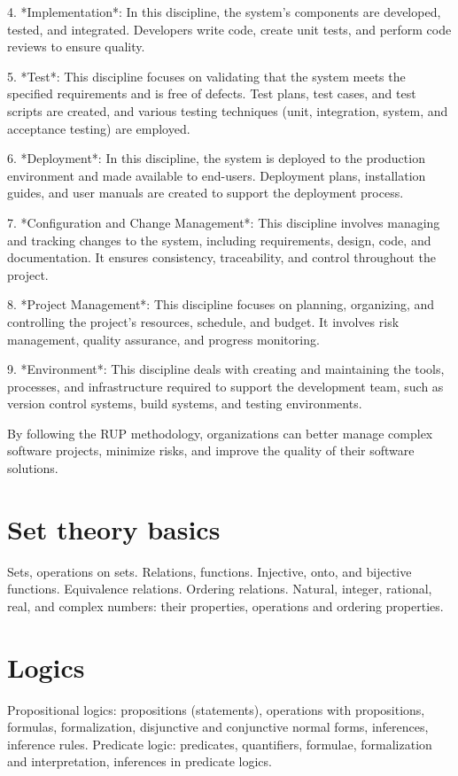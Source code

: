 \documentclass{article}
\begin{document}
4. *Implementation*: In this discipline, the system's components are developed, tested, and integrated. Developers write code, create unit tests, and perform code reviews to ensure quality.

5. *Test*: This discipline focuses on validating that the system meets the specified requirements and is free of defects. Test plans, test cases, and test scripts are created, and various testing techniques (unit, integration, system, and acceptance testing) are employed.

6. *Deployment*: In this discipline, the system is deployed to the production environment and made available to end-users. Deployment plans, installation guides, and user manuals are created to support the deployment process.

7. *Configuration and Change Management*: This discipline involves managing and tracking changes to the system, including requirements, design, code, and documentation. It ensures consistency, traceability, and control throughout the project.

8. *Project Management*: This discipline focuses on planning, organizing, and controlling the project's resources, schedule, and budget. It involves risk management, quality assurance, and progress monitoring.

9. *Environment*: This discipline deals with creating and maintaining the tools, processes, and infrastructure required to support the development team, such as version control systems, build systems, and testing environments.

By following the RUP methodology, organizations can better manage complex software projects, minimize risks, and improve the quality of their software solutions.


\section{Set theory basics}

Sets, operations on sets. Relations, functions. Injective, onto, and bijective functions. Equivalence relations. Ordering relations. Natural, integer, rational, real, and complex numbers: their properties, operations and ordering properties.


\section{Logics}

Propositional logics: propositions (statements), operations with propositions, formulas, formalization, disjunctive and conjunctive normal forms, inferences, inference rules. Predicate logic: predicates, quantifiers, formulae, formalization and interpretation, inferences in predicate logics.
\end{document}
